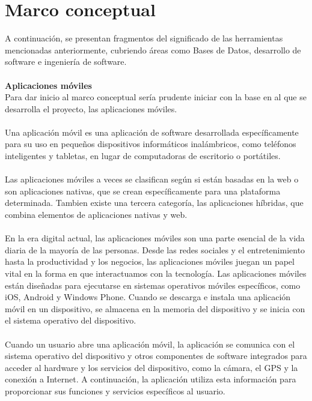 \documentclass[12pt,onehalfspacing]{report}
\begin{document}
\section{Marco conceptual}
A continuación, se presentan fragmentos del significado de las herramientas mencionadas anteriormente, cubriendo áreas como Bases de Datos, desarrollo de software e ingeniería de software.\\\\
\textbf{Aplicaciones móviles}\\
Para dar inicio al marco conceptual sería prudente iniciar con la base en al que se desarrolla el proyecto, las aplicaciones móviles. \\\\Una aplicación móvil es una aplicación de software desarrollada específicamente para su uso en pequeños dispositivos informáticos inalámbricos, como teléfonos inteligentes y tabletas, en lugar de computadoras de escritorio o portátiles.\\\\Las aplicaciones móviles a veces se clasifican según si están basadas en la web o son aplicaciones nativas, que se crean específicamente para una plataforma determinada. Tambien existe una tercera categoría, las aplicaciones híbridas, que combina elementos de aplicaciones nativas y web.\\\\En la era digital actual, las aplicaciones móviles son una parte esencial de la vida diaria de la mayoría de las personas. Desde las redes sociales y el entretenimiento hasta la productividad y los negocios, las aplicaciones móviles juegan un papel vital en la forma en que interactuamos con la tecnología. 
Las aplicaciones móviles están diseñadas para ejecutarse en sistemas operativos móviles específicos, como iOS, Android y Windows Phone. Cuando se descarga e instala una aplicación móvil en un dispositivo, se almacena en la memoria del dispositivo y se inicia con el sistema operativo del dispositivo.\\\\Cuando un usuario abre una aplicación móvil, la aplicación se comunica con el sistema operativo del dispositivo y otros componentes de software integrados para acceder al hardware y los servicios del dispositivo, como la cámara, el GPS y la conexión a Internet. A continuación, la aplicación utiliza esta información para proporcionar sus funciones y servicios específicos al usuario.\\\\
\end{document}
